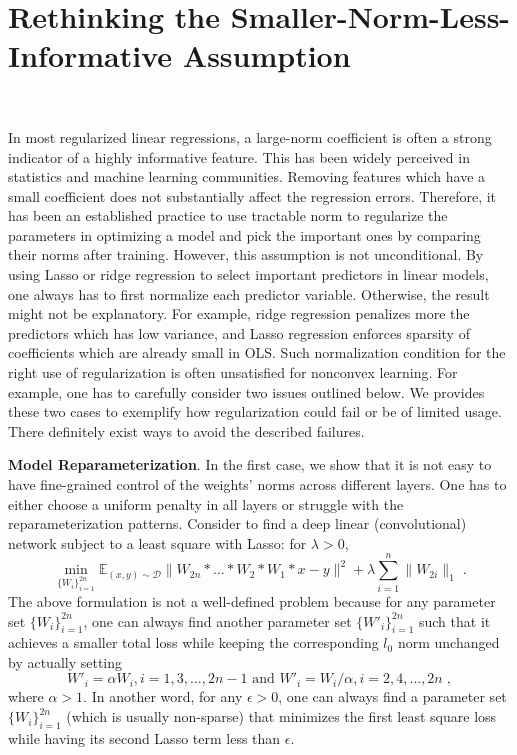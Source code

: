 \documentclass{article} %
\begin{document}
\section{Rethinking the Smaller-Norm-Less-Informative Assumption}~\label{sec:gap}

In most regularized linear regressions, a large-norm coefficient is often a strong indicator of 
a highly informative feature. This has been widely perceived in statistics and machine learning
communities. Removing features which have a small coefficient does not substantially affect the
regression errors. Therefore, it has been an established practice to use tractable norm to regularize
the parameters in optimizing a model and pick the important ones by comparing their norms after training. 
However, this assumption is not unconditional. 
By using Lasso or ridge regression to select important predictors in linear models, one always has to first normalize each predictor variable. Otherwise, the result might not be explanatory. For example, ridge regression penalizes more the predictors which has low variance, and Lasso regression enforces sparsity of coefficients which are already small in OLS.
Such normalization condition for the right use of regularization is often unsatisfied for nonconvex learning. 
For example, one has to carefully consider two issues outlined below. 
We provides these two cases to exemplify how regularization could fail or be of limited usage. There definitely exist ways to avoid the described failures.


\textbf{Model Reparameterization}.
In the first case, we show that it is not easy to have fine-grained control of the weights' norms across different layers. One has to either choose a uniform penalty in all layers or struggle with the reparameterization patterns.
Consider to find a deep linear (convolutional) network subject to
a least square with Lasso: for $\lambda > 0$,
\[\min_{\{W_i\}_{i=1}^{2n}} \mathbb{E}_{(x,y)\sim \mathcal D} \|W_{2n} * \ldots * W_2 * W_1 * x - y\|^2  + \lambda \sum_{i=1}^{n}\| W_{2i}\|_1\;.\]
The above formulation is not a well-defined problem because for any parameter set $\{W_i\}_{i=1}^{2n}$, one can always
find another parameter set $\{W'_i\}_{i=1}^{2n}$ such that it achieves a smaller total loss while keeping the corresponding $l_0$ norm unchanged by actually setting
\[W'_i = \alpha W_i, i=1,3,\ldots,2n-1 \mbox{ and } W'_i = W_i/\alpha, i=2,4,\ldots,2n\;,\]
where $\alpha > 1$. In another word, for any $\epsilon > 0$, one can always find a
parameter set $\{W_i\}_{i=1}^{2n}$ (which is usually non-sparse)
that minimizes the first least square loss while having its second Lasso term less than $\epsilon$.
\end{document}
